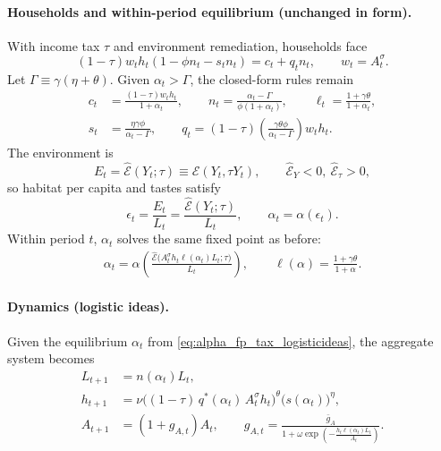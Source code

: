 \documentclass[11pt]{article}
\begin{document}
\paragraph{Households and within-period equilibrium (unchanged in form).}
With income tax $\tau$ and environment remediation, households face
\[
(1-\tau)w_t h_t(1-\phi n_t-s_t n_t)=c_t+q_t n_t,\qquad w_t=A_t^\sigma.
\]
Let $\Gamma\equiv\gamma(\eta+\theta)$. Given $\alpha_t>\Gamma$, the closed-form rules remain
\begin{align}
c_t &= \frac{(1-\tau)w_t h_t}{1+\alpha_t}, \qquad
n_t = \frac{\alpha_t-\Gamma}{\phi(1+\alpha_t)}, \qquad
\ell_t=\frac{1+\gamma\theta}{1+\alpha_t},
\label{eq:policies_tax_repeat_1}\\
s_t &= \frac{\eta\gamma\phi}{\alpha_t-\Gamma}, \qquad
q_t=(1-\tau)\left(\frac{\gamma\theta\phi}{\alpha_t-\Gamma}\right)w_t h_t.
\label{eq:policies_tax_repeat_2}
\end{align}
The environment is
\[
E_t=\widehat{\mathcal{E}}(Y_t;\tau)\equiv \mathcal{E}(Y_t,\tau Y_t),
\qquad \widehat{\mathcal{E}}_Y<0,\ \widehat{\mathcal{E}}_\tau>0,
\]
so habitat per capita and tastes satisfy
\[
\epsilon_t=\frac{E_t}{L_t}=\frac{\widehat{\mathcal{E}}(Y_t;\tau)}{L_t},
\qquad 
\alpha_t=\alpha(\epsilon_t).
\]
Within period $t$, $\alpha_t$ solves the same fixed point as before:
\begin{align}
\alpha_t
=\alpha\!\left(
\frac{\widehat{\mathcal{E}}\!\big(A_t^\sigma h_t\ell(\alpha_t)L_t;\tau\big)}{L_t}
\right),
\qquad 
\ell(\alpha)=\frac{1+\gamma\theta}{1+\alpha}.
\label{eq:alpha_fp_tax_logisticideas}
\end{align}

\paragraph{Dynamics (logistic ideas).}
Given the equilibrium $\alpha_t$ from \eqref{eq:alpha_fp_tax_logisticideas}, the aggregate system becomes
\begin{align}
L_{t+1} &= n(\alpha_t)L_t,
\label{eq:L_dyn_logisticideas}\\
h_{t+1} 
&=\nu\Big((1-\tau)\,q^\ast(\alpha_t)\,A_t^\sigma h_t\Big)^\theta \Big(s(\alpha_t)\Big)^\eta,
\label{eq:h_dyn_logisticideas}\\
A_{t+1} &= (1+g_{A,t})A_t,\qquad 
g_{A,t}=\frac{\bar g_A}{1+\omega\exp\!\left(-\frac{h_t\ell(\alpha_t)L_t}{A_t}\right)}.
\label{eq:A_dyn_logisticideas}
\end{align}

\end{document}
